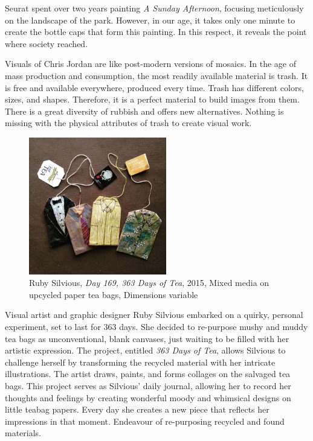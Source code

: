 Seurat spent over two years painting \textit{A Sunday Afternoon}, focusing meticulously on the landscape of the park. However, in our age, it takes only one minute to create the bottle caps that form this painting. In this respect, it reveals the point where society reached.

Visuals of Chris Jordan are like post-modern versions of mosaics. In the age of mass production and consumption, the most readily available material is trash. It is free and available everywhere, produced every time. Trash has different colors, sizes, and shapes. Therefore, it is a perfect material to build images from them. There is a great diversity of rubbish and offers new alternatives. Nothing is missing with the physical attributes of trash to create visual work.

\begin{figure}[h!]
  \centering
  \includegraphics[height=6cm]{graphics/rubysilvious-teabag-Day169.jpg}
  \caption{Ruby Silvious, \textit{Day 169, 363 Days of Tea}, 2015, Mixed media on upcycled paper tea bags, Dimensions variable}
  \label{fig:RubySilvious_TeaBag}
\end{figure}
  
Visual artist and graphic designer Ruby Silvious embarked on a quirky, personal experiment, set to last for 363 days. She decided to re-purpose mushy and muddy tea bags as unconventional, blank canvases, just waiting to be filled with her artistic expression. The project, entitled \textit{363 Days of Tea}, allows Silvious to challenge herself by transforming the recycled material with her intricate illustrations. The artist draws, paints, and forms collages on the salvaged tea bags. This project serves as Silvious’ daily journal, allowing her to record her thoughts and feelings by creating wonderful moody and whimsical designs on little teabag papers. Every day she creates a new piece that reflects her impressions in that moment. Endeavour of re-purposing recycled and found materials. 

